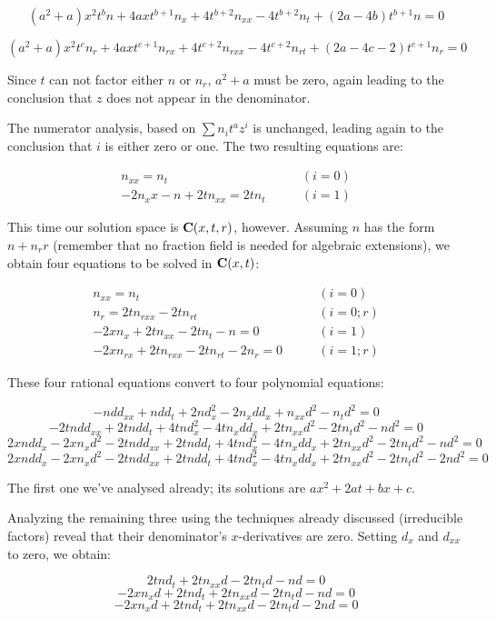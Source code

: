 \documentclass{article}
\newcommand{\C}{\ensuremath{{\bf C}}}
\begin{document}
$$(a^{2} +a)x^{2}t^{b}n +4axt^{b +1}n_{x} +4t^{b +2}n_{xx} -4t^{b +2}n_{t} +(2a -4b)t^{b +1}n = 0$$

$$(a^{2} +a)x^{2}t^{c}n_r +4axt^{c +1}n_{rx} +4t^{c +2}n_{rxx} -4t^{c +2}n_{rt} +(2a -4c -2)t^{c +1}n_r = 0$$

Since $t$ can not factor either $n$ or $n_r$, $a^2+a$ must be zero, again
leading to the conclusion that $z$ does not appear in the denominator.

The numerator analysis, based on $\sum n_i t^a z^i$ is unchanged, leading
again to the conclusion that $i$ is either zero or one.  The two resulting
equations are:

\begin{align*}
n_{xx} = n_t   & \qquad (i=0) \\
-2n_x x - n + 2 t n_{xx} = 2 t n_t  &  \qquad (i=1)
\end{align*}

This time our solution space is $\C(x,t,r)$, however.  Assuming $n$
has the form $n + n_r r$ (remember that no fraction field is needed
for algebraic extensions), we obtain four equations to be solved in $\C(x,t)$:

\begin{align*}
n_{xx} = n_t  & \qquad (i=0) \\
n_r = 2tn_{rxx} -2tn_{rt} & \qquad (i=0; r) \\
-2xn_{x} +2tn_{xx} -2tn_{t} -n = 0 & \qquad (i=1) \\
-2xn_{rx} +2tn_{rxx} -2tn_{rt} -2n_r = 0 & \qquad (i=1; r)
\end{align*}

These four rational equations convert to four polynomial equations:

$$-ndd_{xx} +ndd_t +2nd_x^{2} -2n_xdd_x +n_{xx}d^{2} -n_td^{2} = 0$$
$$-2tndd_{xx} +2tndd_t +4tnd_x^{2} -4tn_xdd_x +2tn_{xx}d^{2} -2tn_td^{2} -nd^{2} = 0$$
$$2xndd_x -2xn_xd^{2} -2tndd_{xx} +2tndd_t +4tnd_x^{2} -4tn_xdd_x +2tn_{xx}d^{2} -2tn_td^{2} -nd^{2} = 0$$
$$2xndd_x -2xn_xd^{2} -2tndd_{xx} +2tndd_t +4tnd_x^{2} -4tn_xdd_x +2tn_{xx}d^{2} -2tn_td^{2} -2nd^{2} = 0$$

The first one we've analysed already; its solutions are $ax^2 + 2at + bx +c$.

Analyzing the remaining three using the techniques already discussed
(irreducible factors) reveal that their denominator's $x$-derivatives
are zero.  Setting $d_x$ and $d_{xx}$ to zero, we obtain:

$$2tnd_t +2tn_{xx}d -2tn_td -nd = 0$$
$$-2xn_xd +2tnd_t +2tn_{xx}d -2tn_td -nd = 0$$
$$-2xn_xd +2tnd_t +2tn_{xx}d -2tn_td -2nd = 0$$
\end{document}

